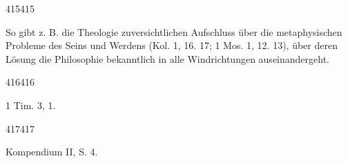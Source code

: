 \vfill

\footnotesize
\noindent

        
415415

      

So gibt z. B. die Theologie zuversichtlichen Aufschluss über die metaphysischen Probleme des Seins und Werdens (Kol. 1, 16. 17; 1 Mos. 1, 12. 13), über deren Lösung die Philosophie bekanntlich in alle Windrichtungen auseinandergeht.\

        
416416

      

1 Tim. 3, 1.\

        
417417

      

Kompendium II, S. 4.
